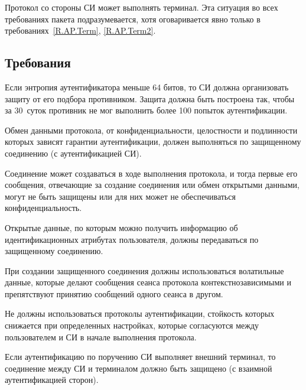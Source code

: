 Протокол со стороны СИ может выполнять терминал. Эта ситуация во всех  
требованиях пакета подразумевается, хотя оговаривается явно только в 
требованиях~\ref{R.AP.Term}, \ref{R.AP.Term2}. 

\subsection{Требования}\label{AP.Reqs}

\label{Req.AP.Attempts}
Если энтропия аутентификатора меньше 64 битов, то СИ должна организовать защиту 
от его подбора противником. Защита должна быть построена так, чтобы за 
30~суток противник не мог выполнить более 100 попыток аутентификации.

Обмен данными протокола, от конфиденциальности, целостности и подлинности 
которых зависят гарантии аутентификации, должен выполняться по защищенному 
соединению (с аутентификацией СИ).

\begin{note*}
Соединение может создаваться в ходе выполнения протокола, и тогда
первые его сообщения, отвечающие за создание соединения или обмен открытыми 
данными, могут не быть защищены или для них может не обеспечиваться 
конфиденциальность.
\end{note*}


Открытые данные, по которым можно получить информацию об идентификационных 
атрибутах пользователя, должны передаваться по защищенному соединению.


При создании защищенного соединения должны использоваться волатильные данные,
которые делают сообщения сеанса протокола контекстнозависимыми и препятствуют 
принятию сообщений одного сеанса в другом.


Не должны использоваться протоколы аутентификации, стойкость
которых снижается при определенных настройках, которые согласуются между
пользователем и СИ в начале выполнения протокола.


\label{R.AP.Term}
Если аутентификацию по поручению СИ выполняет внешний терминал, то 
соединение между СИ и терминалом должно быть защищено (с взаимной 
аутентификацией сторон).

